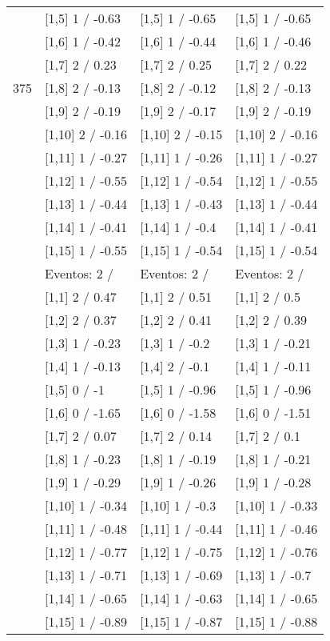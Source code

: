 \begin{table}
\begin{tabular}[t]{llll}
 & {}[1,5] 1  / -0.63 & {}[1,5] 1  / -0.65 & {}[1,5] 1  / -0.65\\
 & {}[1,6] 1  / -0.42 & {}[1,6] 1  / -0.44 & {}[1,6] 1  / -0.46\\
 & {}[1,7] 2  / 0.23 & {}[1,7] 2  / 0.25 & {}[1,7] 2  / 0.22\\
375 & {}[1,8] 2  / -0.13 & {}[1,8] 2  / -0.12 & {}[1,8] 2  / -0.13\\
\addlinespace
 & {}[1,9] 2  / -0.19 & {}[1,9] 2  / -0.17 & {}[1,9] 2  / -0.19\\
 & {}[1,10] 2  / -0.16 & {}[1,10] 2  / -0.15 & {}[1,10] 2  / -0.16\\
 & {}[1,11] 1  / -0.27 & {}[1,11] 1  / -0.26 & {}[1,11] 1  / -0.27\\
 & {}[1,12] 1  / -0.55 & {}[1,12] 1  / -0.54 & {}[1,12] 1  / -0.55\\
 & {}[1,13] 1  / -0.44 & {}[1,13] 1  / -0.43 & {}[1,13] 1  / -0.44\\
\addlinespace
 & {}[1,14] 1  / -0.41 & {}[1,14] 1  / -0.4 & {}[1,14] 1  / -0.41\\
 & {}[1,15] 1  / -0.55 & {}[1,15] 1  / -0.54 & {}[1,15] 1  / -0.54\\
 & Eventos:  2 / & Eventos:  2 / & Eventos:  2 /\\
 & {}[1,1] 2  / 0.47 & {}[1,1] 2  / 0.51 & {}[1,1] 2  / 0.5\\
 & {}[1,2] 2  / 0.37 & {}[1,2] 2  / 0.41 & {}[1,2] 2  / 0.39\\
\addlinespace
 & {}[1,3] 1  / -0.23 & {}[1,3] 1  / -0.2 & {}[1,3] 1  / -0.21\\
 & {}[1,4] 1  / -0.13 & {}[1,4] 2  / -0.1 & {}[1,4] 1  / -0.11\\
 & {}[1,5] 0  / -1 & {}[1,5] 1  / -0.96 & {}[1,5] 1  / -0.96\\
 & {}[1,6] 0  / -1.65 & {}[1,6] 0  / -1.58 & {}[1,6] 0  / -1.51\\
 & {}[1,7] 2  / 0.07 & {}[1,7] 2  / 0.14 & {}[1,7] 2  / 0.1\\
\addlinespace
500 & {}[1,8] 1  / -0.23 & {}[1,8] 1  / -0.19 & {}[1,8] 1  / -0.21\\
 & {}[1,9] 1  / -0.29 & {}[1,9] 1  / -0.26 & {}[1,9] 1  / -0.28\\
 & {}[1,10] 1  / -0.34 & {}[1,10] 1  / -0.3 & {}[1,10] 1  / -0.33\\
 & {}[1,11] 1  / -0.48 & {}[1,11] 1  / -0.44 & {}[1,11] 1  / -0.46\\
 & {}[1,12] 1  / -0.77 & {}[1,12] 1  / -0.75 & {}[1,12] 1  / -0.76\\
\addlinespace
 & {}[1,13] 1  / -0.71 & {}[1,13] 1  / -0.69 & {}[1,13] 1  / -0.7\\
 & {}[1,14] 1  / -0.65 & {}[1,14] 1  / -0.63 & {}[1,14] 1  / -0.65\\
 & {}[1,15] 1  / -0.89 & {}[1,15] 1  / -0.87 & {}[1,15] 1  / -0.88\\
\bottomrule
\end{tabular}
\end{table}
